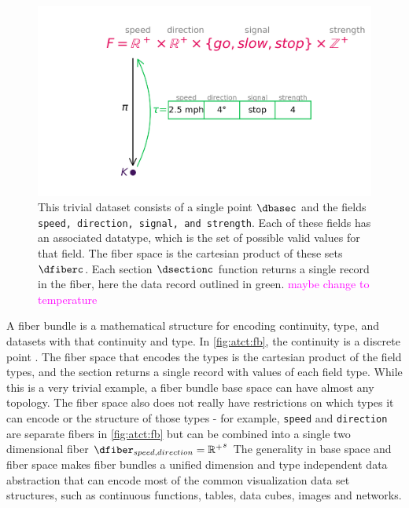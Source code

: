 \documentclass[10pt,journal,compsoc]{IEEEtran}
\newcommand{\note}[1]{\textcolor{magenta}{#1}}
\theoremstyle{definition}
\theoremstyle{remark}
\begin{document}
\begin{figure}[h!]
  \label{fig:atct:fb}
  \includegraphics[width=\columnwidth]{fb_tau.png}
  \caption{This trivial dataset consists of a single point $\dbasec$ and the fields \texttt{speed, direction, signal, and strength}. Each of these fields has an associated datatype, which is the set of possible valid values for that field. The fiber space is the cartesian product of these sets $\dfiberc$. Each section $\dsectionc$ function returns a single record in the fiber, here the data record outlined in green.  
  \note{maybe change to temperature}}
\end{figure} 
A fiber bundle is a mathematical structure for encoding continuity, type, and datasets with that continuity and type. In \autoref{fig:atct:fb}, the continuity is a discrete point \dbase. The fiber space that encodes the types is the cartesian product of the field types, and the section returns a single record with values of each field type. While this is a very trivial example, a fiber bundle base space can have almost any topology. The fiber space also does not really have restrictions on which types it can encode or the structure of those types - for example, \texttt{speed} and \texttt{direction} are separate fibers in \autoref{fig:atct:fb} but can be combined into a single two dimensional fiber $\dfiber_{speed, direction} = {\mathbb{R}^{+}}^{s}$ The generality in base space and fiber space makes fiber bundles a unified dimension and type independent data abstraction that can encode most of the common visualization data set structures, such as continuous functions, tables, data cubes, images and networks. 
\end{document}
